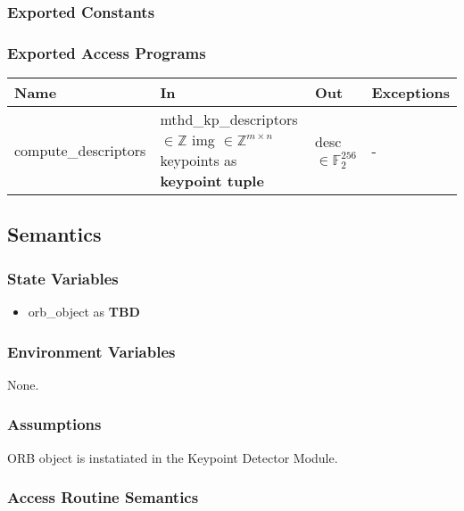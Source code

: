 \documentclass[12pt, titlepage]{article}
\begin{document}
\subsubsection{Exported Constants}

\subsubsection{Exported Access Programs}

\begin{center}
\begin{tabular}{p{4cm} p{5cm} p{4cm} p{2cm}}
\hline
\textbf{Name} & \textbf{In} & \textbf{Out} & \textbf{Exceptions} \\
\hline
compute\_descriptors & mthd\_kp\_descriptors $\in \mathbb{Z}$ \newline
img $\in \mathbb{Z}^{m\times n}$ \newline 
keypoints as \textbf{keypoint tuple}& desc $\in \mathbb{F}_{2}^{256}$ & - \\
\hline
\end{tabular}
\end{center}

\subsection{Semantics}

\subsubsection{State Variables}
\begin{itemize}
  \item orb\_object as \textbf{TBD}
\end{itemize}

\subsubsection{Environment Variables}

None.

\subsubsection{Assumptions}

ORB object is instatiated in the Keypoint Detector Module.

\subsubsection{Access Routine Semantics}
\end{document}
